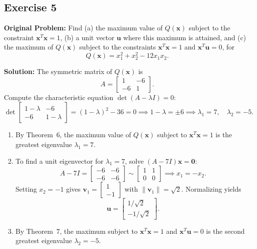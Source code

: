 \documentclass[11pt, letterpaper]{article}
\theoremstyle{definition}
\theoremstyle{remark}
\begin{document}
\subsection{Exercise 5}
\textbf{Original Problem:} Find (a) the maximum value of $Q(\mathbf{x})$ subject to the constraint $\mathbf{x}^T \mathbf{x} = 1$, (b) a unit vector $\mathbf{u}$ where this maximum is attained, and (c) the maximum of $Q(\mathbf{x})$ subject to the constraints $\mathbf{x}^T \mathbf{x} = 1$ and $\mathbf{x}^T \mathbf{u} = 0$, for
\[
Q(\mathbf{x}) = x_1^2 + x_2^2 - 12x_1x_2.
\]

\textbf{Solution:}
The symmetric matrix of $Q(\mathbf{x})$ is
\[
A = \begin{bmatrix} 1 & -6 \\ -6 & 1 \end{bmatrix}.
\]
Compute the characteristic equation $\det(A - \lambda I) = 0$:
\[
\det\begin{bmatrix} 1 - \lambda & -6 \\ -6 & 1 - \lambda \end{bmatrix} = (1 - \lambda)^2 - 36 = 0 \implies 1 - \lambda = \pm 6 \implies \lambda_1 = 7, \quad \lambda_2 = -5.
\]
\begin{enumerate}[label=(\alph*)]
    \item By Theorem~6, the maximum value of $Q(\mathbf{x})$ subject to $\mathbf{x}^T \mathbf{x} = 1$ is the greatest eigenvalue $\lambda_1 = 7$.
    \item To find a unit eigenvector for $\lambda_1 = 7$, solve $(A - 7I)\mathbf{x} = \mathbf{0}$:
    \[
    A - 7I = \begin{bmatrix} -6 & -6 \\ -6 & -6 \end{bmatrix} \sim \begin{bmatrix} 1 & 1 \\ 0 & 0 \end{bmatrix} \implies x_1 = -x_2.
    \]
    Setting $x_2 = -1$ gives $\mathbf{v}_1 = \begin{bmatrix} 1 \\ -1 \end{bmatrix}$ with $\|\mathbf{v}_1\| = \sqrt{2}$. Normalizing yields
    \[
    \mathbf{u} = \begin{bmatrix} 1/\sqrt{2} \\ -1/\sqrt{2} \end{bmatrix}.
    \]
    \item By Theorem~7, the maximum subject to $\mathbf{x}^T \mathbf{x} = 1$ and $\mathbf{x}^T \mathbf{u} = 0$ is the second greatest eigenvalue $\lambda_2 = -5$.
\end{enumerate}
\end{document}

